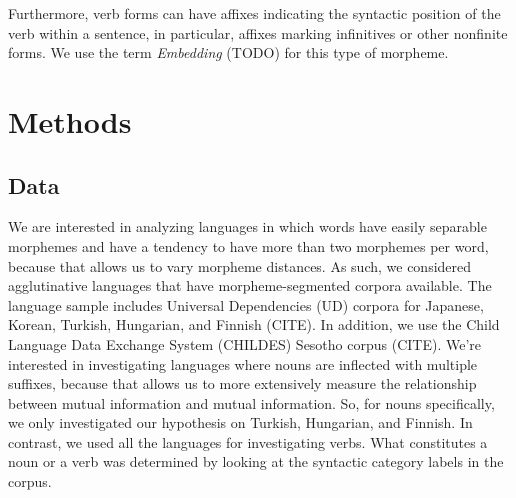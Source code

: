 \documentclass[11pt,letterpaper]{article}
\begin{document}
Furthermore, verb forms can have affixes indicating the syntactic position of the verb within a sentence, in particular, affixes marking infinitives or other nonfinite forms.
We use the term \textit{Embedding} (TODO) for this type of morpheme.








\section{Methods}

\subsection{Data} %

We are interested in analyzing languages in which words have easily separable morphemes and have a tendency to have more than two morphemes per word, because that allows us to vary morpheme distances. As such, we considered agglutinative languages that have morpheme-segmented corpora available. The language sample includes Universal Dependencies (UD) corpora for Japanese, Korean, Turkish, Hungarian, and Finnish (CITE). In addition, we use the Child Language Data Exchange System (CHILDES) Sesotho corpus (CITE). 
We're interested in investigating languages where nouns are inflected with multiple suffixes, because that allows us to more extensively measure the relationship between mutual information and mutual information. So, for nouns specifically, we only investigated our hypothesis on Turkish, Hungarian, and Finnish. In contrast, we used all the languages for investigating verbs. What constitutes a noun or a verb was determined by looking at the syntactic category labels in the corpus. 
\end{document}
